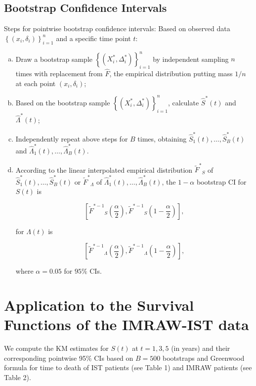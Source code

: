 \documentclass[11pt]{article}
\newcommand{\hsS}{\hat{S}^{*}}
\newcommand{\hsLam}{\hat{\Lambda}^{*}}
\newcommand{\hF}{\hat{F}}
\newcommand{\tsF}{{\tilde{F}^{*}}}
\newcommand{\invtsF}{{\tilde{F}^{*-1}}}
\begin{document}
\subsection{Bootstrap Confidence Intervals}
Steps for pointwise bootstrap confidence intervals:
Based on observed data $\left\{ (x_i,\delta_i) \right\}_{i=1}^n$ and a specific
time point $t$:
\begin{enumerate}[(a)]
\item Draw a bootstrap sample $\left\{ (X_i^{*},\Delta_i^{*}) \right\}_{i=1}^n$
  by independent sampling $n$ times with replacement from $\hF$, the empirical
  distribution putting mass $1/n$ at each point $(x_i,\delta_i)$;
\item Based on the bootstrap sample $\left\{ (X_i^{*},\Delta_i^{*})
  \right\}_{i=1}^n$, calculate $\hsS (t)$ and $\hsLam (t)$;
\item Independently repeat above steps for $B$ times, obtaining
  $\hsS_1(t),\dots, \hsS_B(t)$ and $\hsLam_1(t),\dots,\hsLam_B(t)$.
\item According to the linear interpolated empirical distribution $\tsF_S$ of
  $\hsS_1(t),\dots, \hsS_B(t)$ or $\tsF_{\Lambda}$ of
  $\hsLam_1(t),\dots,\hsLam_B(t)$, the $1-\alpha$ bootstrap CI for $S(t)$ is

\begin{equation*}
  \left[\invtsF_S\left(\frac{\alpha}{2}\right), \invtsF_S\left(1-\frac{\alpha}{2}\right)\right],
\end{equation*}

  for $\Lambda (t)$ is 
  
\begin{equation*}
\left[\invtsF_{\Lambda}\left(\frac{\alpha}{2}\right), \invtsF_{\Lambda}\left(1-\frac{\alpha}{2}\right)\right],
\end{equation*}

where $\alpha = 0.05$ for $95\%$ CIs.

\end{enumerate}

\section{Application to the Survival Functions of the IMRAW-IST data}

We compute the KM estimates for $S(t)$ at $t = 1,3,5$ (in years) and their
corresponding pointwise 95\% CIs based on $B=500$ bootstraps and Greenwood
formula for time to death of IST patients (see Table 1) and IMRAW
patients (see Table 2).
\end{document}
